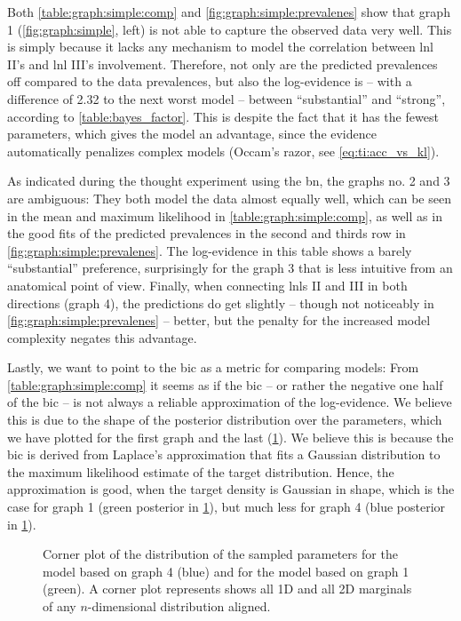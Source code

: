 \documentclass[\relativeRoot/main.tex]{subfiles}
\begin{document}
Both \cref{table:graph:simple:comp} and \cref{fig:graph:simple:prevalenes} show that graph 1 (\cref{fig:graph:simple}, left) is not able to capture the observed data very well. This is simply because it lacks any mechanism to model the correlation between \gls{lnl} II's and \gls{lnl} III's involvement. Therefore, not only are the predicted prevalences off compared to the data prevalences, but also the log-evidence is -- with a difference of 2.32 to the next worst model -- between ``substantial'' and ``strong'', according to \cref{table:bayes_factor}. This is despite the fact that it has the fewest parameters, which gives the model an advantage, since the evidence automatically penalizes complex models (Occam's razor, see \cref{eq:ti:acc_vs_kl}).

As indicated during the thought experiment using the \acrlong{bn}, the graphs no. 2 and 3 are ambiguous: They both model the data almost equally well, which can be seen in the mean and maximum likelihood in \cref{table:graph:simple:comp}, as well as in the good fits of the predicted prevalences in the second and thirds row in \cref{fig:graph:simple:prevalenes}. The log-evidence in this table shows a barely ``substantial'' preference, surprisingly for the graph 3 that is less intuitive from an anatomical point of view. Finally, when connecting \glspl{lnl} II and III in both directions (graph 4), the predictions do get slightly -- though not noticeably in \cref{fig:graph:simple:prevalenes} -- better, but the penalty for the increased model complexity negates this advantage.

Lastly, we want to point to the \gls{bic} as a metric for comparing models: From \cref{table:graph:simple:comp} it seems as if the \gls{bic} -- or rather the negative one half of the \gls{bic} -- is not always a reliable approximation of the log-evidence. We believe this is due to the shape of the posterior distribution over the parameters, which we have plotted for the first graph and the last (\cref{fig:graph:simple:corner}). We believe this is because the \gls{bic} is derived from Laplace's approximation that fits a Gaussian distribution to the maximum likelihood estimate of the target distribution. Hence, the approximation is good, when the target density is Gaussian in shape, which is the case for graph 1 (green posterior in \cref{fig:graph:simple:corner}), but much less for graph 4 (blue posterior in \cref{fig:graph:simple:corner}).

\begin{figure}
    \centering
    \def\svgwidth{1.0\textwidth}
    
    \caption[
        Corner plots of the graphs no. 1 and no. 4
    ]{
        Corner plot of the distribution of the sampled parameters for the model based on graph 4 (blue) and for the model based on graph 1 (green). A corner plot represents shows all 1D and all 2D marginals of any $n$-dimensional distribution aligned.
    }
    \label{fig:graph:simple:corner}
\end{figure}
\end{document}
